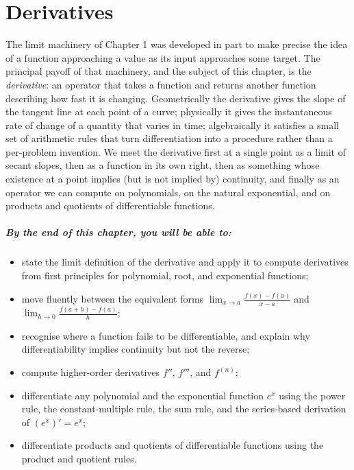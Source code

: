 \chapter{Derivatives}

The limit machinery of Chapter 1 was developed in part to make precise the idea of a function approaching a value as its input approaches some target. The principal payoff of that machinery, and the subject of this chapter, is the \emph{derivative}: an operator that takes a function and returns another function describing how fast it is changing. Geometrically the derivative gives the slope of the tangent line at each point of a curve; physically it gives the instantaneous rate of change of a quantity that varies in time; algebraically it satisfies a small set of arithmetic rules that turn differentiation into a procedure rather than a per-problem invention. We meet the derivative first at a single point as a limit of secant slopes, then as a function in its own right, then as something whose existence at a point implies (but is not implied by) continuity, and finally as an operator we can compute on polynomials, on the natural exponential, and on products and quotients of differentiable functions.

\paragraph{By the end of this chapter, you will be able to:}
\begin{itemize}
    \item state the limit definition of the derivative and apply it to compute derivatives from first principles for polynomial, root, and exponential functions;
    \item move fluently between the equivalent forms \(\lim_{x \to a} \tfrac{f(x) - f(a)}{x - a}\) and \(\lim_{h \to 0} \tfrac{f(a + h) - f(a)}{h}\);
    \item recognise where a function fails to be differentiable, and explain why differentiability implies continuity but not the reverse;
    \item compute higher-order derivatives \(f''\), \(f'''\), and \(f^{(n)}\);
    \item differentiate any polynomial and the exponential function \(e^{x}\) using the power rule, the constant-multiple rule, the sum rule, and the series-based derivation of \((e^{x})' = e^{x}\);
    \item differentiate products and quotients of differentiable functions using the product and quotient rules.
\end{itemize}

